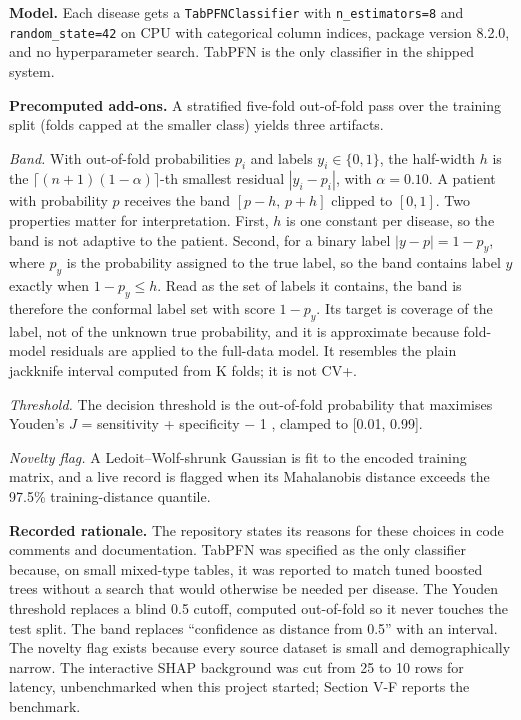 \documentclass[conference]{IEEEtran}
\begin{document}
\textbf{Model.} Each disease gets a \texttt{TabPFNClassifier} with \texttt{n\_estimators=8} and \texttt{random\_state=42} on CPU with categorical column indices, package version 8.2.0, and no hyperparameter search. TabPFN is the only classifier in the shipped system.

\textbf{Precomputed add-ons.} A stratified five-fold out-of-fold pass over the training split (folds capped at the smaller class) yields three artifacts.

\emph{Band.} With out-of-fold probabilities $p_i$ and labels $y_i \in \{0,1\}$, the half-width $h$ is the $\lceil (n+1)(1-\alpha) \rceil$-th smallest residual $|y_i - p_i|$, with $\alpha = 0.10$. A patient with probability $p$ receives the band $[p-h,\, p+h]$ clipped to $[0,1]$. Two properties matter for interpretation. First, $h$ is one constant per disease, so the band is not adaptive to the patient. Second, for a binary label $|y-p| = 1-p_y$, where $p_y$ is the probability assigned to the true label, so the band contains label $y$ exactly when $1-p_y \le h$. Read as the set of labels it contains, the band is therefore the conformal label set with score $1-p_y$. Its target is coverage of the label, not of the unknown true probability, and it is approximate because fold-model residuals are applied to the full-data model. It resembles the plain jackknife interval \cite{barber2021} computed from K folds; it is not CV+.

\emph{Threshold.} The decision threshold is the out-of-fold probability that maximises Youden's $J$ = sensitivity + specificity $-$ 1 \cite{shan2015}, clamped to [0.01, 0.99].

\emph{Novelty flag.} A Ledoit--Wolf-shrunk Gaussian is fit to the encoded training matrix, and a live record is flagged when its Mahalanobis distance exceeds the 97.5\% training-distance quantile.

\textbf{Recorded rationale.} The repository states its reasons for these choices in code comments and documentation. TabPFN was specified as the only classifier because, on small mixed-type tables, it was reported to match tuned boosted trees without a search that would otherwise be needed per disease. The Youden threshold replaces a blind 0.5 cutoff, computed out-of-fold so it never touches the test split. The band replaces ``confidence as distance from 0.5'' with an interval. The novelty flag exists because every source dataset is small and demographically narrow. The interactive SHAP background was cut from 25 to 10 rows for latency, unbenchmarked when this project started; Section V-F reports the benchmark.
\end{document}
